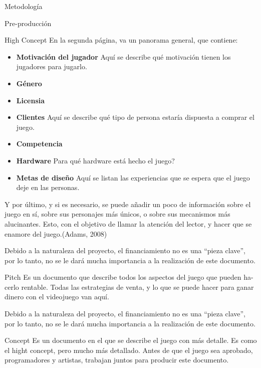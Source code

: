 \begin{section}{Metodología}
\begin{subsection}{Pre-producción}
\begin{subsubsection}{High Concept}
      En la segunda página, va un panorama general, que contiene:

      \begin{itemize}
      \item \textbf{Motivación del jugador} Aquí se describe qué motivación tienen los jugadores para jugarlo.

      \item \textbf{Género}

      \item \textbf{Licensia}

      \item \textbf{Clientes} Aquí se describe qué tipo de persona estaría dispuesta a comprar el juego.

      \item \textbf{Competencia}

      \item \textbf{Hardware} Para qué hardware está hecho el juego?

      \item \textbf{Metas de diseño} Aquí se listan las experiencias que se espera que el juego deje en las personas.
      \end{itemize}


      Y por último, y si es necesario, se puede añadir un poco de información sobre el juego en sí, sobre sus personajes más únicos, o sobre sus mecanismos más alucinantes. Esto, con el objetivo de llamar la atención del lector, y hacer que se enamore del juego.(Adams, 2008)

      Debido a la naturaleza del proyecto, el financiamiento no es una ``pieza clave'', por lo tanto, no se le dará mucha importancia a la realización de este documento.
    \end{subsubsection}

    \begin{subsubsection}{Pitch}
      Es un documento que describe todos los aspectos del juego que pueden ha- cerlo rentable. Todas las estrategias de venta, y lo que se puede hacer para ganar dinero con el videojuego van aquí.

      Debido a la naturaleza del proyecto, el financiamiento no es una ``pieza clave'', por lo tanto, no se le dará mucha importancia a la realización de este documento.
    \end{subsubsection}

    \begin{subsubsection}{Concept}
      Es un documento en el que se describe el juego con más detalle. Es como el hight concept, pero mucho más detallado. Antes de que el juego sea aprobado, programadores y artistas, trabajan juntos para producir este documento.


\end{subsubsection}
\end{subsection}
\end{section}
